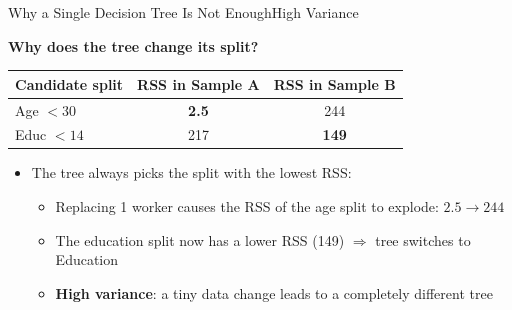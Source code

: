 \documentclass[dvipsnames,hyperref={pdfpagelabels=false}]{beamer}
\begin{document}
\begin{frame}{Why a Single Decision Tree Is Not Enough}{High Variance}

\textbf{Why does the tree change its split?}

\vspace{0.2cm}
\begin{center}
\begin{tabular}{@{}lcc@{}}
  \toprule
  Candidate split & RSS in Sample A & RSS in Sample B \\
  \midrule
  Age $< 30$  & \textbf{2.5} & 244 \\
  Educ $< 14$ & 217          & \textbf{149} \\
  \bottomrule
\end{tabular}
\end{center}

\vspace{0.2cm}
\begin{itemize}

\item The tree always picks the split with the lowest RSS:
\begin{itemize}
  \item Replacing 1 worker causes the RSS of the age split to explode: $2.5 \to 244$
  \vspace{0.1cm}
  \item The education split now has a lower RSS (149) $\Rightarrow$ tree switches to Education
  \vspace{0.1cm}
  \item[$\Rightarrow$] \textbf{High variance}: a tiny data change leads to a completely different tree
\end{itemize}
\end{itemize}

\end{frame}
\end{document}
